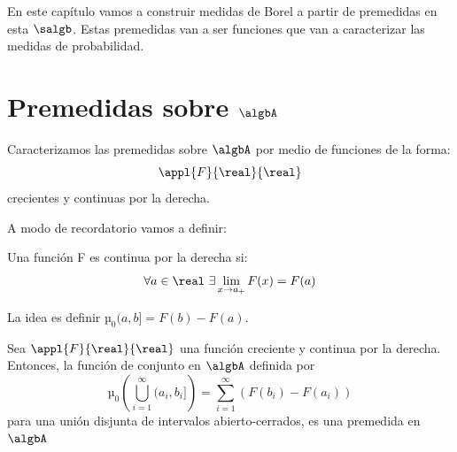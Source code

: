 \documentclass{apuntes}
\begin{document}
En este capítulo vamos a construir medidas de Borel a partir de premedidas en esta $\salgb$. Estas premedidas van a ser funciones que van a caracterizar las medidas de probabilidad.

\section{Premedidas sobre $\algbA$}
Caracterizamos las premedidas sobre $\algbA$ por medio de funciones de la forma:
\[\appl{F}{\real}{\real}\]
crecientes y continuas por la derecha.

A modo de recordatorio vamos a definir:

\begin{defn}
Una función F es continua por la derecha si:
\[\forall a \in \real \ \exists \lim_{x \to a_+}F(x)=F(a)\]
\end{defn}

La idea es definir $µ_0(a,b]=F(b)-F(a)$.

\begin{prop}
Sea $\appl{F}{\real}{\real}$ una función creciente y continua por la derecha. Entonces, la función de conjunto en $\algbA$ definida por
\[µ_0\left(\bigcup_{i=1}^{\infty}(a_i, b_i]\right) = \sum_{i=1}^{\infty}(F(b_i)-F(a_i))\]
para una unión disjunta de intervalos abierto-cerrados, es una premedida en $\algbA$
\end{prop}
\end{document}
